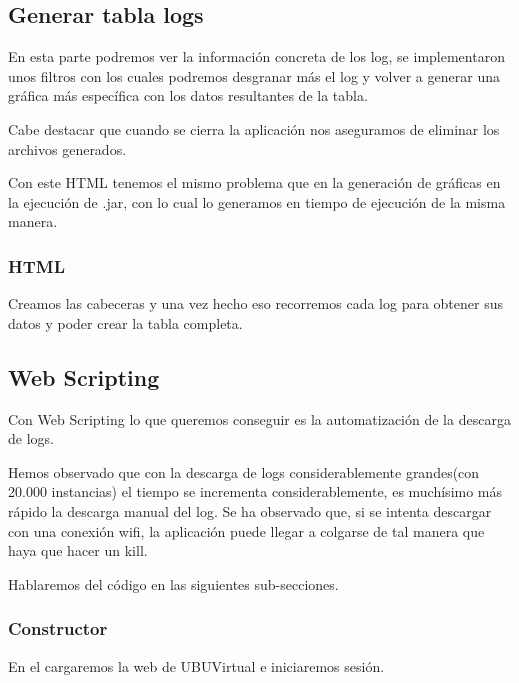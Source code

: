 \subsection{Generar tabla logs}\label{generar-tabla-log}
 
 En esta parte podremos ver la información concreta de los log, se implementaron unos filtros con los cuales podremos desgranar más el log y volver a generar una gráfica más específica con los datos resultantes de la tabla.
 
 Cabe destacar que cuando se cierra la aplicación nos aseguramos de eliminar los archivos generados.
 
 Con este HTML tenemos el mismo problema que en la generación de gráficas en la ejecución de .jar, con lo cual lo generamos en tiempo de ejecución de la misma manera.
 
\subsubsection{HTML}\label{html-tabla-log}
 

Creamos las cabeceras y una vez hecho eso recorremos cada log para obtener sus datos y poder crear la tabla completa.

\subsection{Web Scripting}\label{web-scripting}

Con Web Scripting lo que queremos conseguir es la automatización de la descarga de logs.

Hemos observado que con la descarga de logs considerablemente grandes(con 20.000 instancias) el tiempo se incrementa considerablemente, es muchísimo más rápido la descarga manual del log. Se ha observado que, si se intenta descargar con una conexión wifi, la aplicación puede llegar a colgarse de tal manera que haya que hacer un kill.

Hablaremos del código en las siguientes sub-secciones.

\subsubsection{Constructor}\label{constructor}

En el cargaremos la web de UBUVirtual e iniciaremos sesión.

